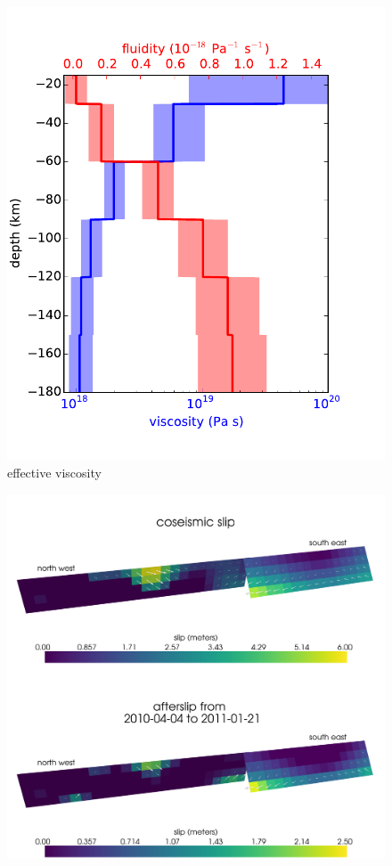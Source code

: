 \documentclass[1p]{elsarticle}
\begin{document}
\begin{figure}
\includegraphics[scale=1.0]{Figures/effective_viscosity}
\centering 
\caption{effective viscosity}
\label{fig:EffectiveViscosity}
\end{figure} 

\begin{figure}
\includegraphics[scale=0.09]{Figures/initialslip}
\caption{}
\label{fig:InitialSlip}
\end{figure} 
\end{document}

